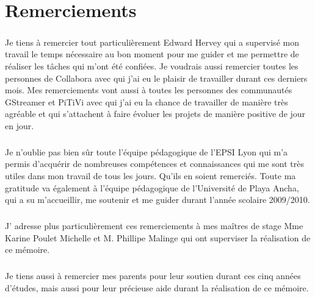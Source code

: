 \newpage \chapter*{Remerciements}

\paragraph {}

Je tiens à remercier tout particulièrement Edward Hervey qui a
supervisé mon travail %
le temps nécessaire au bon moment pour me guider et me permettre
de réaliser les tâches qui m'ont été confiées.
Je voudrais aussi remercier toutes les personnes de Collabora
avec qui j'ai eu le plaisir de travailler durant ces derniers mois.
Mes remerciements vont aussi à toutes les personnes des communautés GStreamer
et PiTiVi avec qui j'ai eu la chance de travailler de manière très
agréable et qui s'attachent à faire évoluer les projets de manière
positive de jour en jour.

\paragraph {}

Je n'oublie pas bien sûr toute l'équipe pédagogique de l'EPSI Lyon
qui m'a permis d'acquérir de nombreuses compétences et connaissances
qui me sont très utiles dans mon travail de tous les jours. Qu'ils en soient remerciés.
Toute ma gratitude va également à l'équipe pédagogique de l'Université de Playa Ancha,
qui a su m'accueillir, me soutenir et me guider durant l'année scolaire 2009/2010.

\paragraph {}

J' adresse plus particulièrement ces remerciements à mes maîtres de
stage Mme Karine Poulet Michelle et M. Phillipe Malinge qui ont
superviser la réalisation de ce mémoire.

\paragraph {}

Je tiens aussi à remercier mes parents pour leur soutien durant ces
cinq années d'études, mais aussi pour leur précieuse aide durant la
réalisation de ce mémoire.
